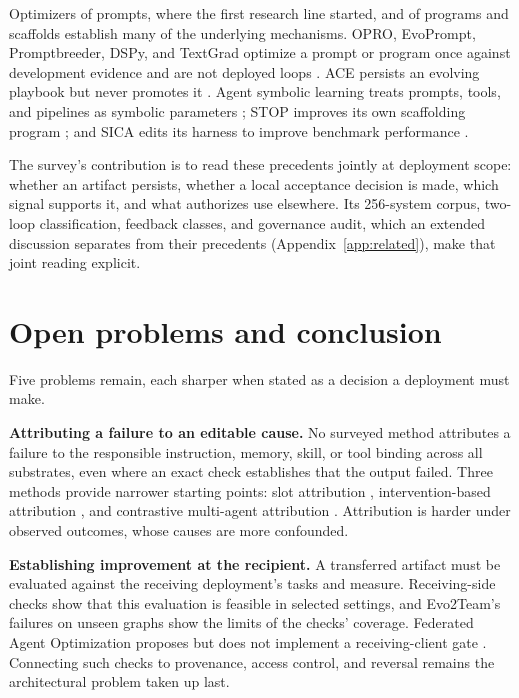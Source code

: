\documentclass[
  11pt,
]{article}
\begin{document}
Optimizers of prompts, where the first research line started, and of programs and scaffolds establish many of the underlying mechanisms. OPRO, EvoPrompt, Promptbreeder, DSPy, and TextGrad optimize a prompt or program once against development evidence and are not deployed loops \cite{yang2023opro, guo2023evoprompt, fernando2023promptbreeder, khattab2023dspy, yuksekgonul2024textgrad}. ACE persists an evolving playbook but never promotes it \cite{ace2025agentic}. Agent symbolic learning treats prompts, tools, and pipelines as symbolic parameters \cite{zhou2024symbolic}; STOP improves its own scaffolding program \cite{zelikman2023stop}; and SICA edits its harness to improve benchmark performance \cite{robeyns2025sica}.

The survey's contribution is to read these precedents jointly at deployment scope: whether an artifact persists, whether a local acceptance decision is made, which signal supports it, and what authorizes use elsewhere. Its 256-system corpus, two-loop classification, feedback classes, and governance audit, which an extended discussion separates from their precedents (Appendix~\ref{app:related}), make that joint reading explicit.

\section{Open problems and conclusion}\label{sec:open}

Five problems remain, each sharper when stated as a decision a deployment must make.

\textbf{Attributing a failure to an editable cause.} No surveyed method attributes a failure to the responsible instruction, memory, skill, or tool binding across all substrates, even where an exact check establishes that the output failed. Three methods provide narrower starting points: slot attribution \cite{nguyen2026harnessevo}, intervention-based attribution \cite{chu2026agentgrad}, and contrastive multi-agent attribution \cite{zehle2026cantante}. Attribution is harder under observed outcomes, whose causes are more confounded.

\textbf{Establishing improvement at the recipient.} A transferred artifact must be evaluated against the receiving deployment's tasks and measure. Receiving-side checks show that this evaluation is feasible in selected settings, and Evo2Team's failures on unseen graphs show the limits of the checks' coverage. Federated Agent Optimization proposes but does not implement a receiving-client gate \cite{yang2026fao}. Connecting such checks to provenance, access control, and reversal remains the architectural problem taken up last.
\end{document}

